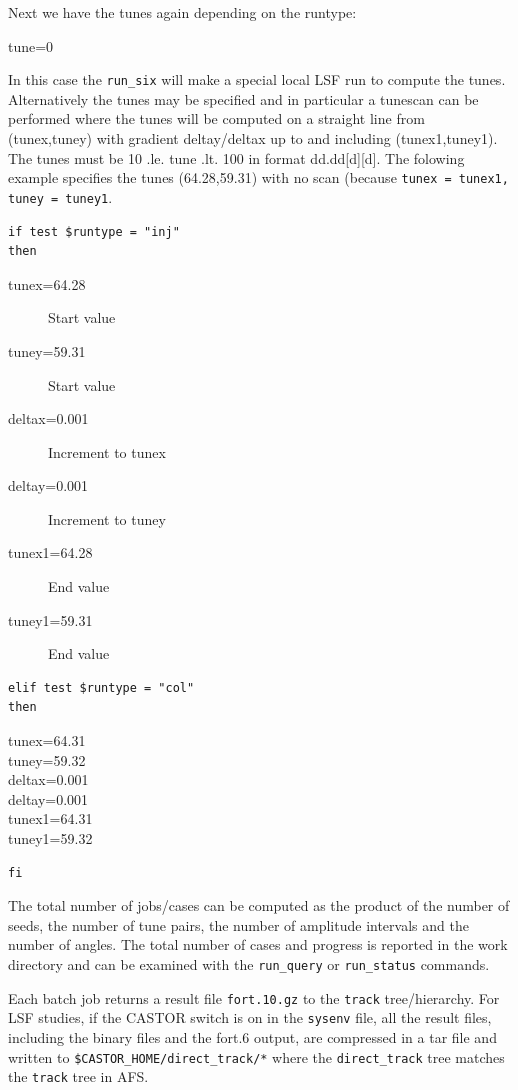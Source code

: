 \documentclass{article}    %
\begin{document}
Next we have the tunes again depending on the runtype:
\begin{description} 
\item[tune=0]
\end{description} 
In this case the {\tt run\_six} will make a special local LSF run
to compute the tunes. Alternatively the tunes may be specified
and in particular a tunescan can be performed where 
the tunes will be computed on a straight line from
(tunex,tuney) with gradient deltay/deltax up to and including (tunex1,tuney1).
The tunes must be 10 .le. tune .lt. 100 in format dd.dd[d][d].
The folowing example specifies the tunes (64.28,59.31) with no scan
(because {\tt tunex = tunex1, tuney = tuney1}. 
\begin{verbatim}
if test $runtype = "inj"
then
\end{verbatim}
\begin{description}
\item[tunex=64.28] Start value
\item[tuney=59.31] Start value
\item[deltax=0.001] Increment to tunex
\item[deltay=0.001] Increment to tuney
\item[tunex1=64.28] End value
\item[tuney1=59.31] End value
\end{description}
\begin{verbatim}
elif test $runtype = "col"
then
\end{verbatim}
\begin{description}
\item[tunex=64.31]
\item[tuney=59.32]
\item[deltax=0.001]
\item[deltay=0.001]
\item[tunex1=64.31]
\item[tuney1=59.32]
\end{description}
\begin{verbatim}
fi
\end{verbatim}
The total number of jobs/cases can be computed as the product of the number of
seeds, the number of tune pairs, the number of amplitude intervals 
and the number of angles.
The total number of cases and progress is reported in the work directory and
can be examined with the {\tt run\_query} or {\tt run\_status} commands. 

Each batch job returns a result file {\tt fort.10.gz} to the {\tt track}
tree/hierarchy. For LSF studies, if the CASTOR switch is on in the {\tt sysenv} file,
all the result files, including the binary files and the fort.6 output, 
are compressed in a tar file and written to 
{\tt \$CASTOR\_HOME/direct\_track/*} where the 
{\tt direct\_track} tree matches the {\tt track} tree in AFS.
\end{document}
